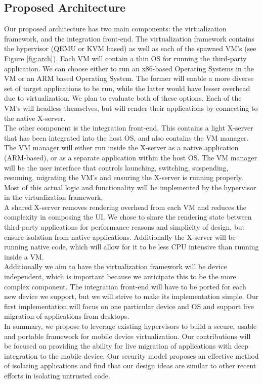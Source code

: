 \subsection{Proposed Architecture}
\label{sec:proposedarch}
Our proposed architecture has two main components: the virtualization framework, and the integration front-end.  The virtualization framework contains the hypervisor (QEMU or KVM based) as well as each of the spawned VM's (see Figure \ref{fig:arch}).  Each VM will contain a thin OS for running the third-party application.  We can choose either to run an x86-based Operating Systems in the VM or an ARM based Operating System. The former will enable a more diverse set of target applications to be run, while the latter would have lesser overhead due to virtualization. We plan to evaluate both of these options. Each of the VM's will headless themselves, but will render their applications by connecting to the native X-server. \\

The other component is the integration front-end.  This contains a light X-server that has been integrated into the host OS, and also contains the VM manager.  The VM manager will either run inside the X-server as a native application (ARM-based), or as a separate application within the host OS.  The VM manager will be the user interface that controls launching, switching, suspending, resuming, migrating the VM's and ensuring the X-server is running properly. Most of this actual logic and functionality will be implemented by the hypervisor in the virtualization framework.\\

A shared X-server removes rendering overhead from each VM and reduces the complexity in composing the UI. We chose to share the rendering state between third-party applications for performance reasons and simplicity of design, but ensure isolation from native applications.  Additionally the X-server will be running native code, which will allow for it to be less CPU intensive than running inside a VM. \\

Additionally we aim to have the virtualization framework will be device independent, which is important because we anticipate this to be the more complex component.  The integration front-end will have to be ported for each new device we support, but we will strive to make its implementation simple. Our first implementation will focus on one particular device and OS and support live migration of applications from desktops. \\

In summary, we propose to leverage existing hypervisors to build a secure, usable and portable framework for mobile device virtualization. Our contributions will be focused on providing the ability for live migration of applications with deep integration to the mobile device. Our security model proposes an effective method of isolating applications and find that our design ideas are similar to other recent efforts \cite{grier2008secure} in isolating untrusted code.
